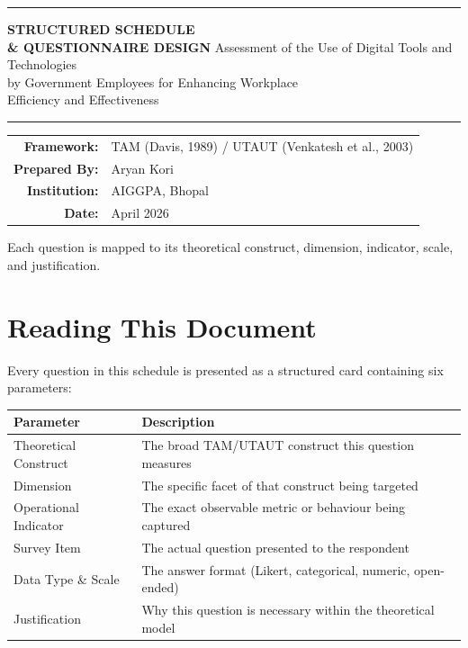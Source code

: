 \documentclass[11pt,a4paper]{article}
\begin{document}
\begin{titlepage}\centering
\vspace*{3cm}
{\color{gold}\rule{0.6\textwidth}{2pt}}\vspace{1cm}
{\Huge\bfseries\color{navy} STRUCTURED SCHEDULE\\[8pt] \& QUESTIONNAIRE DESIGN}\vspace{0.6cm}
{\Large\color{dk} Assessment of the Use of Digital Tools and Technologies\\[4pt]by Government Employees for Enhancing Workplace\\[4pt]Efficiency and Effectiveness}\vspace{1cm}
{\color{gold}\rule{0.6\textwidth}{2pt}}\vspace{2cm}
\begin{tabular}{r l}
\textbf{\color{navy}Framework:} & TAM (Davis, 1989) / UTAUT (Venkatesh et al., 2003) \\[6pt]
\textbf{\color{navy}Prepared By:} & Aryan Kori \\[6pt]
\textbf{\color{navy}Institution:} & AIGGPA, Bhopal \\[6pt]
\textbf{\color{navy}Date:} & April 2026 \\
\end{tabular}\vfill
{\small\color{mg}Each question is mapped to its theoretical construct, dimension, indicator, scale, and justification.}
\end{titlepage}

\tableofcontents\newpage

\section*{Reading This Document}

Every question in this schedule is presented as a structured card containing six parameters:

\begin{table}[H]\centering\small
\begin{tabularx}{\textwidth}{L{3.5cm} X}
\toprule
\textbf{Parameter} & \textbf{Description} \\
\midrule
Theoretical Construct & The broad TAM/UTAUT construct this question measures \\[3pt]
Dimension & The specific facet of that construct being targeted \\[3pt]
Operational Indicator & The exact observable metric or behaviour being captured \\[3pt]
Survey Item & The actual question presented to the respondent \\[3pt]
Data Type \& Scale & The answer format (Likert, categorical, numeric, open-ended) \\[3pt]
Justification & Why this question is necessary within the theoretical model \\
\bottomrule
\end{tabularx}
\end{table}
\end{document}
